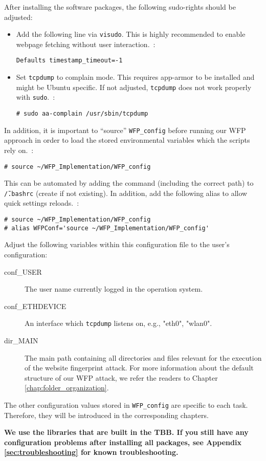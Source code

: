 After installing the software packages, the following sudo-rights should be adjusted:
\begin{itemize}
\item Add the following line via \texttt{visudo}. This is highly recommended to enable webpage fetching without user interaction.~:
\vspace{-3mm} 
\begin{verbatim}
Defaults timestamp_timeout=-1 
\end{verbatim}
\item Set \texttt{tcpdump} to complain mode. This requires app-armor to be installed and might be Ubuntu specific. If not adjusted, \texttt{tcpdump} does not work properly with \texttt{sudo}.~: 
\vspace{-3mm}
\begin{verbatim} 
# sudo aa-complain /usr/sbin/tcpdump
\end{verbatim}
\end{itemize}

In addition, it is important to ``source'' \texttt{WFP\_config} before running our \ac{WFP} approach in order to load the stored environmental variables which the scripts rely on.~:
\vspace{-3mm}
\begin{verbatim} 
# source ~/WFP_Implementation/WFP_config
\end{verbatim}
This can be automated by adding the command (including the correct path) to \texttt{\~/.bashrc} (create if not existing). In addition, add the following alias to allow quick settings reloads.~:
\vspace{-3mm}
\begin{verbatim} 
# source ~/WFP_Implementation/WFP_config
# alias WFPConf='source ~/WFP_Implementation/WFP_config'
\end{verbatim}

Adjust the following variables within this configuration file to the user's configuration:
\begin{description}
\item [conf\_USER] The user name currently logged in the operation system.
\item [conf\_ETHDEVICE] An interface which \texttt{tcpdump} listens on, e.g., "eth0", "wlan0".
\item [dir\_MAIN] The main path containing all directories and files relevant for the execution of the website fingerprint attack. For more information about the default structure of our \ac{WFP} attack, we refer the readers to Chapter \ref{chap:folder_organization}.
\end{description}

The other configuration values stored in \texttt{WFP\_config} are specific to each task. Therefore, they will be introduced in the corresponding chapters.

\textbf{We use the libraries that are built in the \ac{TBB}. If you still have any configuration problems after installing all packages, see Appendix \ref{sec:troubleshooting} for known troubleshooting.}

